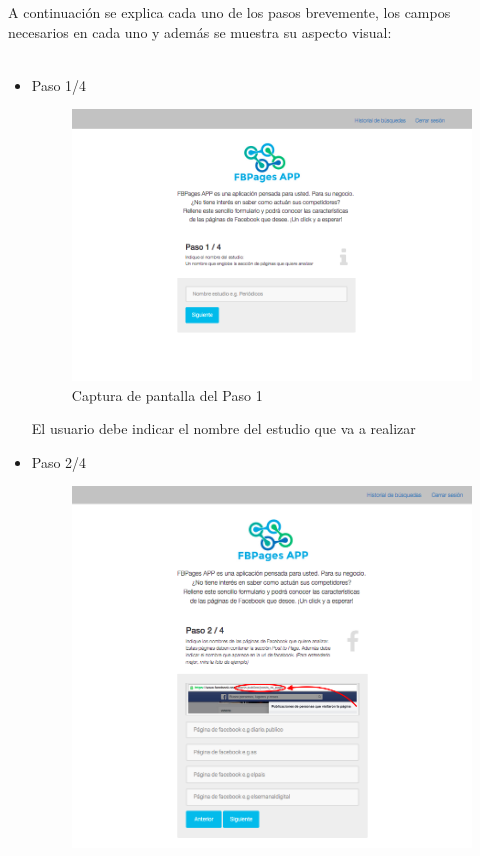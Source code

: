A continuación se explica cada uno de los pasos brevemente, los campos necesarios en cada uno y además se muestra su aspecto visual: \\
\\
\begin{itemize} \itemsep4pt \parskip0pt
\item Paso 1/4 \\
\begin{figure}[H]
\centering
\includegraphics[width=4.5in]{figuras/paso1.png}
\caption{Captura de pantalla del Paso 1} \label{fig:paso1}
\end{figure}
El usuario debe indicar el nombre del estudio que va a realizar
\item Paso 2/4 \\
\begin{figure}[H]
\centering
\includegraphics[width=4.5in]{figuras/paso2.png}

\end{figure}
\end{itemize}
